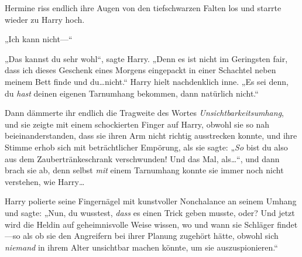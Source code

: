 Hermine riss endlich ihre Augen von den tiefschwarzen Falten los und starrte wieder zu Harry hoch.

„Ich kann nicht—“

„Das kannst du sehr wohl“, sagte Harry. „Denn es ist nicht im Geringsten fair, dass ich dieses Geschenk eines Morgens eingepackt in einer Schachtel neben meinem Bett finde und du…nicht.“ Harry hielt nachdenklich inne. „Es sei denn, du \emph{hast} deinen eigenen Tarnumhang bekommen, dann natürlich nicht.“

Dann dämmerte ihr endlich die Tragweite des Wortes \emph{Unsichtbarkeitsumhang}, und sie zeigte mit einem schockierten Finger auf Harry, obwohl sie so nah beieinanderstanden, dass sie ihren Arm nicht richtig ausstrecken konnte, und ihre Stimme erhob sich mit beträchtlicher Empörung, als sie sagte: „\emph{So} bist du also aus dem Zaubertränkeschrank verschwunden! Und das Mal, als…“, und dann brach sie ab, denn selbst \emph{mit} einem Tarnumhang konnte sie immer noch nicht verstehen, wie Harry…

Harry polierte seine Fingernägel mit kunstvoller Nonchalance an seinem Umhang und sagte: „Nun, du wusstest, \emph{dass} es einen Trick geben musste, oder? Und jetzt wird die Heldin auf geheimnisvolle Weise wissen, wo und wann sie Schläger findet—so als ob sie den Angreifern bei ihrer Planung zugehört hätte, obwohl sich \emph{niemand} in ihrem Alter unsichtbar machen könnte, um sie auszuspionieren.“

